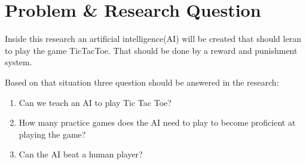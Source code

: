 \section{Problem \& Research Question}

Inside this research an artificial intelligence(AI) will be created that should leran to play the game TicTacToe. That should be done by a reward and punishment system.

Based on that situation three question should be answered in the research:
\begin{enumerate}
	\item Can we teach an AI to play Tic Tac Toe?
	\item How many practice games does the AI need to play to become proficient at playing the game?
	\item Can the AI beat a human player?
\end{enumerate}

